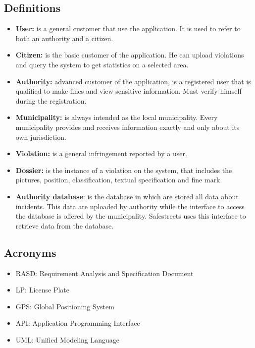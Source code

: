 \documentclass[../RASD.tex]{subfiles}
\begin{document}
    \subsection{Definitions}\label{subsec:definitions}
    \begin{itemize}
        \item \textbf{User:} is a general customer that use the application.
        It is used to refer to both an authority and a citizen.
        \item \textbf{Citizen:} is the basic customer of the application.
        He can upload violations and query the system to get statistics on a selected area.
        \item \textbf{Authority:} advanced customer of the application, is a registered user that is qualified to make fines and view sensitive information.
        Must verify himself during the registration.
        \item \textbf{Municipality:} is always intended as the local municipality.
        Every municipality provides and receives information exactly and only about its own jurisdiction.
        \item \textbf{Violation:} is a general infringement reported by a user.
        \item \textbf{Dossier:} is the instance of a violation on the system, that includes the pictures, position, classification, textual specification and fine mark.
        \item \textbf{Authority database}: is the database in which are stored all data about incidents.
        This data are uploaded by authority while the interface to access the database is offered by the municipality.
        Safestreets uses this interface to retrieve data from the database.
    \end{itemize}
    \subsection{Acronyms}\label{subsec:acronyms}
    \begin{itemize}
        \item RASD: Requirement Analysis and Specification Document
        \item LP: License Plate
        \item GPS: Global Positioning System
        \item API: Application Programming Interface
        \item UML: Unified Modeling Language
    \end{itemize}
\end{document}
